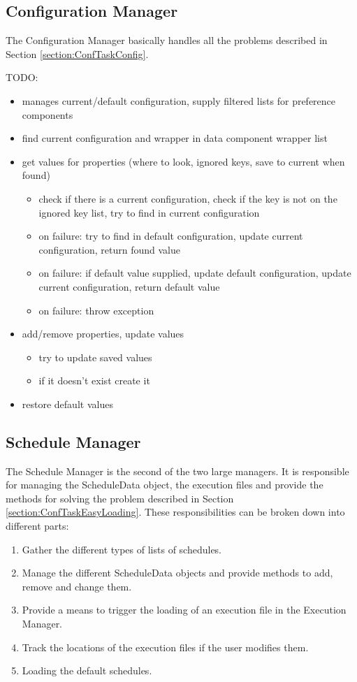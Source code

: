 \subsection{Configuration Manager}
\label{section:ConfigurationManager}
The Configuration Manager basically handles all the problems described in Section \ref{section:ConfTaskConfig}.


TODO:
\begin{itemize}
 \item manages current/default configuration, supply filtered lists for preference components
 \item find current configuration and wrapper in data component wrapper list 
 \item get values for properties (where to look, ignored keys, save to current when found)
  \begin{itemize}
   \item check if there is a current configuration, check if the key is not on the ignored key list, try to find in current configuration
   \item on failure: try to find in default configuration, update current configuration, return found value
   \item on failure: if default value supplied, update default configuration, update current configuration, return default value
   \item on failure: throw exception
  \end{itemize}
 \item add/remove properties, update values
 \begin{itemize}
  \item try to update saved values
  \item if it doesn't exist create it
 \end{itemize}
 \item restore default values
\end{itemize}

\subsection{Schedule Manager}
\label{section:ScheduleManager}
The Schedule Manager is the second of the two large managers. It is responsible for managing the
ScheduleData object, the execution files and provide the methods for solving the problem described
in Section \ref{section:ConfTaskEasyLoading}. These responsibilities can be broken down into
different parts:
\begin{enumerate}
 \item Gather the different types of lists of schedules.
 \item Manage the different ScheduleData objects and provide methods to add, remove and change
them.
 \item Provide a means to trigger the loading of an execution file in the Execution Manager.
 \item Track the locations of the execution files if the user modifies them.
 \item Loading the default schedules.
\end{enumerate}


